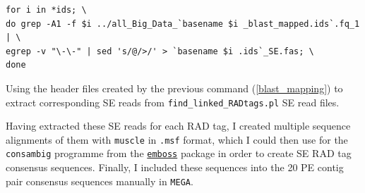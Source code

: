 \documentclass[a4paper,12pt,times,print,index,custombib,custommargin]{PhDThesisPSnPDF}\usepackage[]{graphicx}\usepackage[]{color}
\begin{document}
%
\begin{cmd}
\captionsetup{type=cmd}
\begin{Verbatim}[fontsize=\scriptsize, formatcom=\color{darkgray}]
for i in *ids; \
do grep -A1 -f $i ../all_Big_Data_`basename $i _blast_mapped.ids`.fq_1 | \
egrep -v "\-\-" | sed 's/@/>/' > `basename $i .ids`_SE.fas; \
done
\end{Verbatim}
\caption{\small Using the header files created by the previous command (\ref{blast_mapping}) to extract corresponding SE reads from \texttt{find\_linked\_RADtags.pl} SE read files.}
\label{grep_filter}
\end{cmd}
%
Having extracted these SE reads for each RAD tag, I created multiple sequence alignments of them with \texttt{muscle} in \texttt{.msf} format, which I could then use for the \texttt{consambig} programme from the \href{http://emboss.sourceforge.net/apps/release/6.6/emboss/apps/consambig.html}{\texttt{emboss}} package in order to create SE \gls{RAD tag} consensus sequences. Finally, I included these sequences into the 20 PE contig pair consensus sequences manually in \texttt{MEGA}. 

%
%
%
\end{document}
